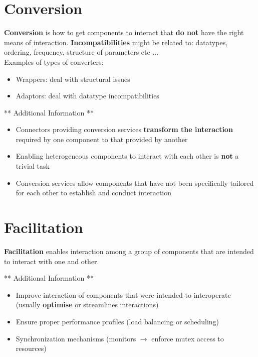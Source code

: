 \documentclass[a4paper]{report}
\begin{document}
\section{Conversion}
\textbf{Conversion} is how to get components to interact that \textbf{do not} have the right means of interaction. \textbf{Incompatibilities} might be related to: datatypes, ordering, frequency, structure of parameters etc ...\\

Examples of types of converters:
\begin{itemize}
\item Wrappers: deal with structural issues
\item Adaptors: deal with datatype incompatibilities\\
\end{itemize}

** Additional Information **
\begin{itemize}
\item Connectors providing conversion services \textbf{transform the interaction} required by one component to that provided by another
\item Enabling heterogeneous components to interact with each other is \textbf{not} a trivial task
\item Conversion services allow components that have not been specifically tailored for each other to establish and conduct interaction
\end{itemize}

\section{Facilitation}
\textbf{Facilitation} enables interaction among a group of components that are intended to interact with one and other.

** Additional Information ** 
\begin{itemize}
\item Improve interaction of components that were intended to interoperate (usually \textbf{optimise} or streamlines interactions)
\item Ensure proper performance profiles (load balancing or scheduling)
\item Synchronization mechanisms (monitors $\rightarrow$ enforce mutex access to resources)
\end{itemize}
\end{document}
